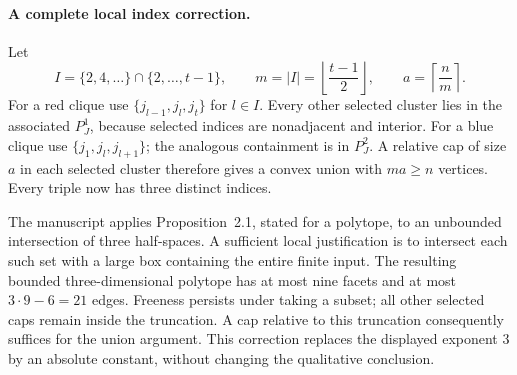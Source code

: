 \documentclass[10pt]{article}
\begin{document}
\paragraph*{A complete local index correction.}\mbox{}\par
Let \[I=\{2,4,\ldots\}\cap\{2,\ldots,t-1\},\qquad
 m=|I|=\left\lfloor\frac{t-1}{2}\right\rfloor,\qquad
 a=\left\lceil\frac nm\right\rceil.\] For a red clique use \(\{j_{l-1},j_l,j_t\}\) for \(l\in I\). Every other selected cluster lies in the associated \(P_J^1\), because selected indices are nonadjacent and interior. For a blue clique use \(\{j_1,j_l,j_{l+1}\}\); the analogous containment is in \(P_J^2\). A relative cap of size \(a\) in each selected cluster therefore gives a convex union with \(ma\ge n\) vertices. Every triple now has three distinct indices.\par
The manuscript applies Proposition 2.1, stated for a polytope, to an unbounded intersection of three half-spaces. A sufficient local justification is to intersect each such set with a large box containing the entire finite input. The resulting bounded three-dimensional polytope has at most nine facets and at most \(3\cdot9-6=21\) edges. Freeness persists under taking a subset; all other selected caps remain inside the truncation. A cap relative to this truncation consequently suffices for the union argument. This correction replaces the displayed exponent \(3\) by an absolute constant, without changing the qualitative conclusion.\par
\end{document}
